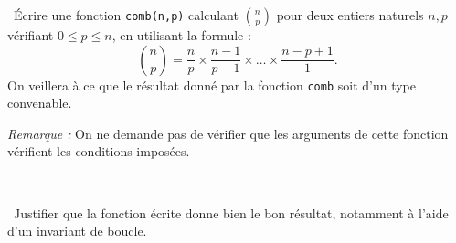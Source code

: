 \exer{}
\setcounter{numques}{0}

\question\ Écrire une fonction \texttt{comb(n,p)} calculant $\displaystyle\binom{n}{p}$ pour deux entiers naturels $n,p$ vérifiant $0 \leq p \leq n$, en utilisant la formule :
    \begin{equation*}
      \binom{n}{p} = \dfrac{n}{p} \times \dfrac{n-1}{p-1} \times \dots \times \dfrac{n-p+1}{1}.
    \end{equation*}
    On veillera à ce que le résultat donné par la fonction \texttt{comb} soit d'un type convenable. 
    
    \emph{Remarque :} On ne demande pas de vérifier que les arguments de cette fonction vérifient les conditions imposées. 

\medskip\    
    
\question\ Justifier que la fonction écrite donne bien le bon résultat, notamment à l'aide d'un invariant de boucle.  
